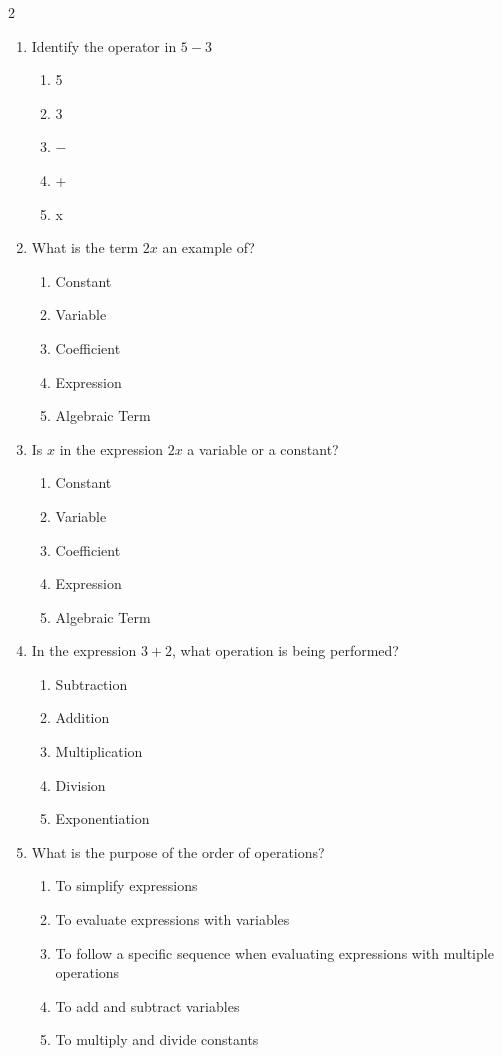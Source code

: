 \documentclass[10pt]{article}
\begin{document}
\begin{multicols}{2}
\begin{enumerate}[label=\textbf{Q\arabic*.}, leftmargin=*, itemsep=6pt, parsep=0pt]
  \item \small Identify the operator in $5 - 3$
  \begin{enumerate}[label=(\Alph*), leftmargin=0.6cm, nosep, itemsep=2pt]
    \item 5
    \item 3
    \item $-$
    \item +
    \item x
  \end{enumerate}

  \item \small What is the term $2x$ an example of?
  \begin{enumerate}[label=(\Alph*), leftmargin=0.6cm, nosep, itemsep=2pt]
    \item Constant
    \item Variable
    \item Coefficient
    \item Expression
    \item Algebraic Term
  \end{enumerate}

  \item \small Is $x$ in the expression $2x$ a variable or a constant?
  \begin{enumerate}[label=(\Alph*), leftmargin=0.6cm, nosep, itemsep=2pt]
    \item Constant
    \item Variable
    \item Coefficient
    \item Expression
    \item Algebraic Term
  \end{enumerate}

  \item \small In the expression $3 + 2$, what operation is being performed?
  \begin{enumerate}[label=(\Alph*), leftmargin=0.6cm, nosep, itemsep=2pt]
    \item Subtraction
    \item Addition
    \item Multiplication
    \item Division
    \item Exponentiation
  \end{enumerate}

  \item \small What is the purpose of the order of operations?
  \begin{enumerate}[label=(\Alph*), leftmargin=0.6cm, nosep, itemsep=2pt]
    \item To simplify expressions
    \item To evaluate expressions with variables
    \item To follow a specific sequence when evaluating expressions with multiple operations
    \item To add and subtract variables
    \item To multiply and divide constants
  \end{enumerate}


\end{enumerate}
\end{multicols}
\end{document}
